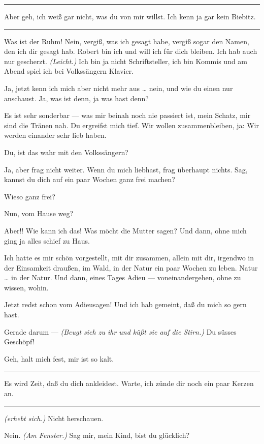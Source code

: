 \documentclass[
	final,
	a4paper,
	ngerman,
	mpinclude = true, %
	twoside = true,
	open = right,
	cleardoublepage = plain,
	DIV = 13,
	BCOR = 1cm,
	titlepage = firstiscover,
	]{scrbook}
\newcommand{\direction}[1]{\textit{(#1)}}
\newenvironment{deletion}{%
		\vspace{0.25\baselineskip}
		\hrule
		\vspace{0.25\baselineskip}
		\color{darkgray}
	}{
		\color{black}
		\vspace{0.25\baselineskip}
		\hrule 
		\vspace{0.25\baselineskip}
	}
\newcommand{\thecharacter}[1]{\textup{\textsc{#1}}\xspace}
\newcommand{\thesuesse}{\thecharacter{Lola}}
\newcommand{\thedichter}{\thecharacter{Robert Bibitz}}
\newcommand{\character}[1]{\item[#1:]}
\newcommand{\suesse}{\character{\thesuesse}}
\newcommand{\dichter}{\character{\thedichter}}
\begin{document}
\begin{play}
\begin{deletion}
	\suesse
	Aber geh, ich weiß gar nicht, was du von mir willst. Ich kenn ja gar kein Biebitz.
	\end{deletion}

	\dichter
	Was ist der Ruhm! Nein, vergiß, was ich gesagt habe, vergiß sogar den Namen, den ich dir gesagt hab. Robert bin ich und will ich für dich bleiben. Ich hab auch nur gescherzt. \direction{Leicht.} Ich bin ja nicht Schriftsteller, ich bin Kommis und am Abend spiel ich bei Volkssängern Klavier.

	\suesse
	Ja, jetzt kenn ich mich aber nicht mehr aus \ldots{} nein, und wie du einen nur anschaust. Ja, was ist denn, ja was hast denn?

	\dichter
	Es ist sehr sonderbar --- was mir beinah noch nie passiert ist, mein Schatz, mir sind die Tränen nah. Du ergreifst mich tief. Wir wollen zusammenbleiben, ja: Wir werden einander sehr lieb haben.

	\suesse
	Du, ist das wahr mit den Volkssängern?

	\dichter
	Ja, aber frag nicht weiter. Wenn du mich liebhast, frag überhaupt nichts. Sag, kannst du dich auf ein paar Wochen ganz frei machen?

	\suesse
	Wieso ganz frei?

	\dichter
	Nun, vom Hause weg?

	\suesse
	Aber!! Wie kann ich das! Was möcht die Mutter sagen? Und dann, ohne mich ging ja alles schief zu Haus.

	\dichter
	Ich hatte es mir schön vorgestellt, mit dir zusammen, allein mit dir, irgendwo in der Einsamkeit draußen, im Wald, in der Natur ein paar Wochen zu leben. Natur \ldots{} in der Natur. Und dann, eines Tages Adieu --- voneinandergehen, ohne zu wissen, wohin.

	\suesse
	Jetzt redst schon vom Adieusagen! Und ich hab gemeint, daß du mich so gern hast.

	\dichter
	Gerade darum --- \direction{Beugt sich zu ihr und küßt sie auf die Stirn.} Du süsses Geschöpf!

	\suesse
	Geh, halt mich fest, mir ist so kalt.

	\begin{deletion}
	\dichter
	Es wird Zeit, daß du dich ankleidest. Warte, ich zünde dir noch ein paar Kerzen an.
	\end{deletion}

	\suesse
	\direction{erhebt sich.} Nicht herschauen.

	\dichter
	Nein. \direction{Am Fenster.} Sag mir, mein Kind, bist du glücklich?


\end{play}
\end{document}
